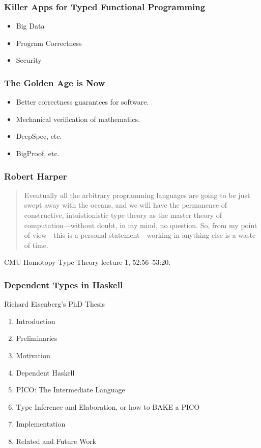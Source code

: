 \documentclass{beamer}
\begin{document}

\begin{frame}\frametitle{Killer Apps for Typed Functional Programming}
\begin{itemize}
\item Big Data
\item Program Correctness
\item Security
\end{itemize}
\end{frame}

\begin{frame}\frametitle{The Golden Age is Now}
\begin{itemize}
\item Better correctness guarantees for software.
\item Mechanical verification of mathematics.
\item DeepSpec, etc.
\item BigProof, etc.
\end{itemize}
\end{frame}

\begin{frame}\frametitle{Robert Harper}
\begin{quote}
Eventually all the arbitrary programming languages are going to be just swept away with the oceans,
and we will have the permanence of constructive, intuistionistic type theory as the master theory
of computation---without doubt, in my mind, no question.  So, from my point of view---this is a personal
statement---working in anything else is a waste of time.
\end{quote}

CMU Homotopy Type Theory lecture 1, 52:56--53:20.
\end{frame}

\begin{frame}\frametitle{Dependent Types in Haskell}
Richard Eisenberg's PhD Thesis  
\begin{enumerate}
\item Introduction
\item Preliminaries
\item Motivation
\item Dependent Haskell
\item PICO: The Intermediate Language
\item Type Inference and Elaboration, or how to BAKE a PICO
\item Implementation
\item Related and Future Work
\end{enumerate}
\end{frame}
\end{document}
